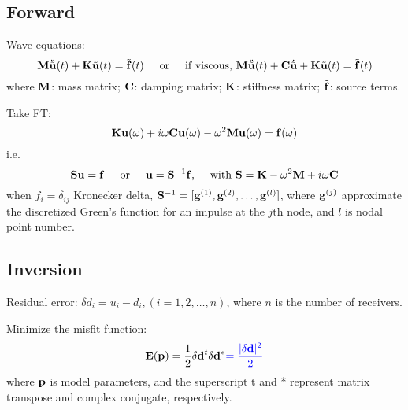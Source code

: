 \subsection{Forward}
Wave equations:
\[ \mathbf{M}\ddot{\tilde{\mathbf{u}}}(t)+\mathbf{K}\tilde{\mathbf{u}}(t)=\tilde{\mathbf{f}}(t) \text{\hspace{5mm}or\hspace{5mm}if viscous,~} \mathbf{M}\ddot{\tilde{\mathbf{u}}}(t)+\mathbf{C}\dot{\tilde{\mathbf{u}}}+\mathbf{K}\tilde{\mathbf{u}}(t)=\tilde{\mathbf{f}}(t) \]
where $\mathbf{M}$: mass matrix; $\mathbf{C}$: damping matrix; $\mathbf{K}$: stiffness matrix; $\tilde{\mathbf{f}}$: source terms.\par
Take FT:
\[ \mathbf{K}\mathbf{u}(\omega)+i\omega\mathbf{C}\mathbf{u}(\omega)-\omega^2\mathbf{M}\mathbf{u}(\omega)=\mathbf{f}(\omega) \]
i.e.
\[ \mathbf{S}\mathbf{u}=\mathbf{f} \text{\hspace{5mm}or\hspace{5mm}} \mathbf{u}=\mathbf{S}^{-1}\mathbf{f} \text{,\hspace{5mm}with~} \mathbf{S}=\mathbf{K}-\omega^2\mathbf{M}+i\omega\mathbf{C} \]
when $f_i=\delta_{ij}$ Kronecker delta, $\mathbf{S}^{-1}=[\mathbf{g}^{(1)},\mathbf{g}^{(2)},\ldots,\mathbf{g}^{(l)}]$, where $\mathbf{g}^{(j)}$ approximate the discretized Green's function for an impulse at the $j$th node, and $l$ is nodal point number.\par
\subsection{Inversion}
Residual error: $\delta d_i=u_i-d_i,(i=1,2,\ldots,n)$, where $n$ is the number of receivers.\par
Minimize the misfit function:
\[ \mathbf{E}(\mathbf{p})=\frac{1}{2}\delta\mathbf{d}^t\delta\mathbf{d}^*{\color{blue}=\frac{|\delta\mathbf{d}|^2}{2}} \]
where $\mathbf{p}$ is model parameters, and the superscript t and * represent matrix transpose and complex conjugate, respectively.\par
